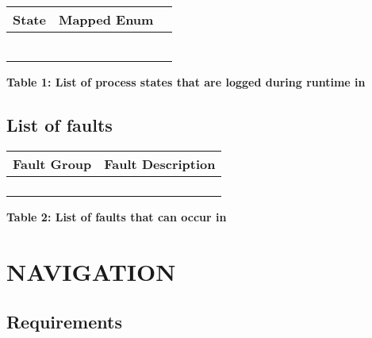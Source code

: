 \begin{table}[H]
	\begin{center}
		\begin{tabular}{|p{3 cm}|p{5 cm}|p{5 cm}|}
			\hline
			\textbf{State} & \textbf{Mapped Enum} \\
			\hline
			&  \\
			\hline
			&  \\
			\hline
			&  \\
			\hline
			&  \\
			\hline
			&  \\
			\hline
			&  \\
			\hline
		\end{tabular}
		\begin{center}
			\textbf{Table 1: List of process states that are logged during runtime in }
		\end{center}
	\end{center}
\end{table}

\subsection{List of faults}
\begin{table}[H]
	\begin{center}
		\begin{tabular}{|p{6 cm}|p{8 cm}|}
			\hline
			\textbf{Fault Group} & \textbf{Fault Description}\\
			\hline
			&   \\
			\hline
			&  \\
			\hline
			&  \\
			\hline
			&  \\
			\hline
			
		\end{tabular}
		\begin{center}
			\textbf{Table 2: List of faults that can occur in }
		\end{center}
	\end{center}
\end{table}
\newpage

\section{NAVIGATION}
\subsection{Requirements}

